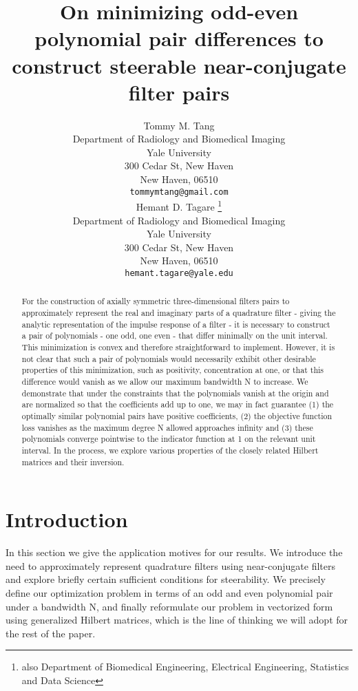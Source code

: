 \documentclass{article}
\title{On minimizing odd-even polynomial pair differences to construct steerable near-conjugate filter pairs}
\author{
 Tommy M. Tang  \\
  Department of Radiology and Biomedical Imaging\\
  Yale University\\
   300 Cedar St, New Haven\\
  New Haven, 06510 \\
  \texttt{tommymtang@gmail.com} \\
   \And
 Hemant D. Tagare \thanks{also Department of Biomedical Engineering, Electrical Engineering, Statistics and Data Science} \\
 Department of Radiology and Biomedical Imaging\\
 Yale University\\
 300 Cedar St, New Haven\\
  New Haven, 06510 \\
  \texttt{hemant.tagare@yale.edu} \\
}
\theoremstyle{definition}
\theoremstyle{remark}
\numberwithin{equation}{section}
\begin{document}
\maketitle

\begin{abstract}
For the construction of axially symmetric three-dimensional filters pairs to approximately represent the real and imaginary parts of a quadrature filter - giving the analytic representation of the impulse response of a filter - it is necessary to construct a pair of polynomials - one odd, one even - that differ minimally on the unit interval. This minimization is convex and therefore straightforward to implement. However, it is not clear that such a pair of polynomials would necessarily exhibit other desirable properties of this minimization, such as positivity, concentration at one, or that this difference would vanish as we allow our maximum bandwidth N to increase. We demonstrate that under the constraints that the polynomials vanish at the origin and are normalized so that the coefficients add up to one, we may in fact guarantee (1) the optimally similar polynomial pairs have positive coefficients, (2) the objective function loss vanishes as the maximum degree N allowed approaches infinity and (3) these polynomials converge pointwise to the indicator function at 1 on the relevant unit interval. In the process, we explore various properties of the closely related Hilbert matrices and their inversion. 
\end{abstract}




\section{Introduction}
\label{Introduction}
In this section we give the application motives for our results. We introduce the need to approximately represent quadrature filters using near-conjugate filters and explore briefly certain sufficient conditions for steerability. We precisely define our optimization problem in terms of an odd and even polynomial pair under a bandwidth N, and finally reformulate our problem in vectorized form using generalized Hilbert matrices, which is the line of thinking we will adopt for the rest of the paper. 
\end{document}
